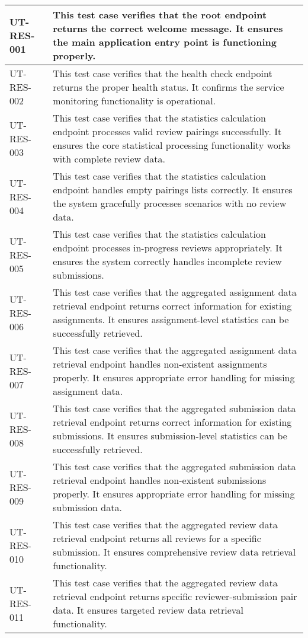 \begin{longtable}{|p{}|p{}|}
UT-RES-001 & This test case verifies that the root endpoint returns the correct welcome message. It ensures the main application entry point is functioning properly. \\
\hline
UT-RES-002 & This test case verifies that the health check endpoint returns the proper health status. It confirms the service monitoring functionality is operational. \\
\hline
UT-RES-003 & This test case verifies that the statistics calculation endpoint processes valid review pairings successfully. It ensures the core statistical processing functionality works with complete review data. \\
\hline
UT-RES-004 & This test case verifies that the statistics calculation endpoint handles empty pairings lists correctly. It ensures the system gracefully processes scenarios with no review data. \\
\hline
UT-RES-005 & This test case verifies that the statistics calculation endpoint processes in-progress reviews appropriately. It ensures the system correctly handles incomplete review submissions. \\
\hline
UT-RES-006 & This test case verifies that the aggregated assignment data retrieval endpoint returns correct information for existing assignments. It ensures assignment-level statistics can be successfully retrieved. \\
\hline
UT-RES-007 & This test case verifies that the aggregated assignment data retrieval endpoint handles non-existent assignments properly. It ensures appropriate error handling for missing assignment data. \\
\hline
UT-RES-008 & This test case verifies that the aggregated submission data retrieval endpoint returns correct information for existing submissions. It ensures submission-level statistics can be successfully retrieved. \\
\hline
UT-RES-009 & This test case verifies that the aggregated submission data retrieval endpoint handles non-existent submissions properly. It ensures appropriate error handling for missing submission data. \\
\hline
UT-RES-010 & This test case verifies that the aggregated review data retrieval endpoint returns all reviews for a specific submission. It ensures comprehensive review data retrieval functionality. \\
\hline
UT-RES-011 & This test case verifies that the aggregated review data retrieval endpoint returns specific reviewer-submission pair data. It ensures targeted review data retrieval functionality. \\

\end{longtable}

